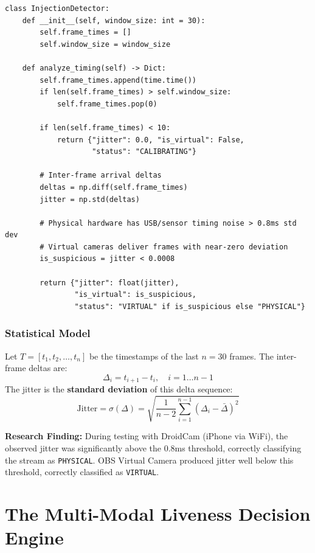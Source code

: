 \documentclass[12pt,a4paper]{report}
\begin{document}
\begin{lstlisting}[style=pythonstyle, caption={Frame Arrival Jitter Analysis --- Injection\_Detection\_Modality.py}]
class InjectionDetector:
    def __init__(self, window_size: int = 30):
        self.frame_times = []
        self.window_size = window_size

    def analyze_timing(self) -> Dict:
        self.frame_times.append(time.time())
        if len(self.frame_times) > self.window_size:
            self.frame_times.pop(0)

        if len(self.frame_times) < 10:
            return {"jitter": 0.0, "is_virtual": False,
                    "status": "CALIBRATING"}

        # Inter-frame arrival deltas
        deltas = np.diff(self.frame_times)
        jitter = np.std(deltas)

        # Physical hardware has USB/sensor timing noise > 0.8ms std dev
        # Virtual cameras deliver frames with near-zero deviation
        is_suspicious = jitter < 0.0008

        return {"jitter": float(jitter),
                "is_virtual": is_suspicious,
                "status": "VIRTUAL" if is_suspicious else "PHYSICAL"}
\end{lstlisting}

\subsection{Statistical Model}
Let $T = [t_1, t_2, \ldots, t_n]$ be the timestamps of the last $n=30$ frames. The inter-frame deltas are:
\[
\Delta_i = t_{i+1} - t_i, \quad i = 1 \ldots n-1
\]
The jitter is the \textbf{standard deviation} of this delta sequence:
\[
\text{Jitter} = \sigma(\Delta) = \sqrt{\frac{1}{n-2} \sum_{i=1}^{n-1} (\Delta_i - \bar{\Delta})^2}
\]

\begin{researchbox}
\textbf{Research Finding:} During testing with DroidCam (iPhone via WiFi), the observed jitter was significantly above the 0.8ms threshold, correctly classifying the stream as \texttt{PHYSICAL}. OBS Virtual Camera produced jitter well below this threshold, correctly classified as \texttt{VIRTUAL}.
\end{researchbox}

\chapter{The Multi-Modal Liveness Decision Engine}
\end{document}
